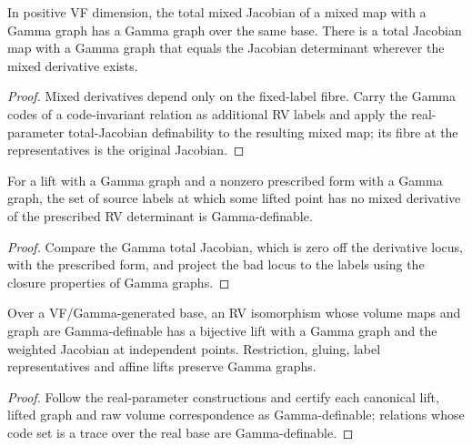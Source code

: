 \begin{lemma}
\label{lem:gamma-total-jacobian}
\leanok
In positive VF dimension, the total mixed Jacobian of a mixed map with
a Gamma graph has a Gamma graph over the same base. There is a total
Jacobian map with a Gamma graph that equals the Jacobian determinant
wherever the mixed derivative exists.
\end{lemma}
\begin{proof}
\leanok
Mixed derivatives depend only on the fixed-label fibre. Carry the
Gamma codes of a code-invariant relation as additional RV labels and
apply the real-parameter total-Jacobian definability to the resulting
mixed map; its fibre at the representatives is the original Jacobian.
\end{proof}

\begin{lemma}
\label{lem:gamma-lift-discrepancy}
\leanok
For a lift with a Gamma graph and a nonzero prescribed form with a
Gamma graph, the set of source labels at which some lifted point has
no mixed derivative of the prescribed RV determinant is
Gamma-definable.
\end{lemma}
\begin{proof}
\leanok
Compare the Gamma total Jacobian, which is zero off the derivative
locus, with the prescribed form, and project the bad locus to the
labels using the closure properties of Gamma graphs.
\end{proof}

\begin{lemma}
\label{lem:gamma-weighted-lift}
\leanok
Over a VF/Gamma-generated base, an RV isomorphism whose volume maps and
graph are Gamma-definable has a bijective lift with a Gamma graph and
the weighted Jacobian at independent points. Restriction, gluing,
label representatives and affine lifts preserve Gamma graphs.
\end{lemma}
\begin{proof}
\leanok
Follow the real-parameter constructions and certify each canonical
lift, lifted graph and raw volume correspondence as Gamma-definable;
relations whose code set is a trace over the real base are
Gamma-definable.
\end{proof}

